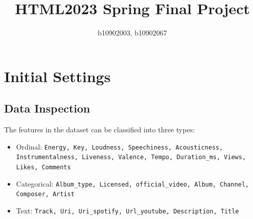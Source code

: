 \documentclass[10pt,letterpaper]{article}
\title{
		\usefont{OT1}{bch}{b}{n}
		\huge HTML2023 Spring Final Project \\
}
\author{b10902003, b10902067}
\begin{document}
\maketitle






\section{Initial Settings}
\subsection{Data Inspection}

The features in the dataset can be classified into three types:
\begin{itemize}
  \item Ordinal: \texttt{Energy, Key, Loudness, Speechiness, Acousticness, Instrumentalness, Liveness, Valence, Tempo, Duration\_ms, Views, Likes, Comments}
  \item Categorical: \texttt{Album\_type, Licensed, official\_video, Album, Channel, Composer, Artist}
  \item Text: \texttt{Track, Uri, Uri\_spotify, Url\_youtube, Description, Title}
\end{itemize}
\end{document}
